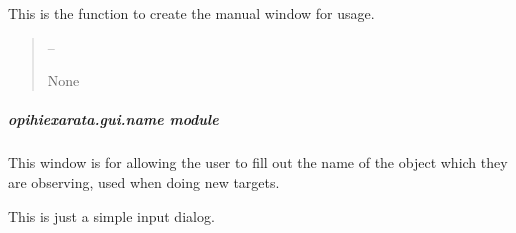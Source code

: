 \documentclass[letterpaper,11pt,english]{sphinxmanual}
\begin{document}

\begin{savenotes}\begin{fulllineitems}
\label{\detokenize{code/opihiexarata.gui.manual:opihiexarata.gui.manual.start_manual_window}}
\pysigstartsignatures
{}
\pysigstopsignatures
\sphinxAtStartPar
This is the function to create the manual window for usage.
\begin{quote}\begin{description}
\sphinxAtStartPar
{} – 

\sphinxAtStartPar
None

\end{description}\end{quote}

\end{fulllineitems}\end{savenotes}


\sphinxstepscope


\subparagraph{opihiexarata.gui.name module}
\label{\detokenize{code/opihiexarata.gui.name:module-opihiexarata.gui.name}}\label{\detokenize{code/opihiexarata.gui.name:opihiexarata-gui-name-module}}\label{\detokenize{code/opihiexarata.gui.name::doc}}
\sphinxAtStartPar
This window is for allowing the user to fill out the name of the object
which they are observing, used when doing new targets.

\sphinxAtStartPar
This is just a simple input dialog.
\end{document}
